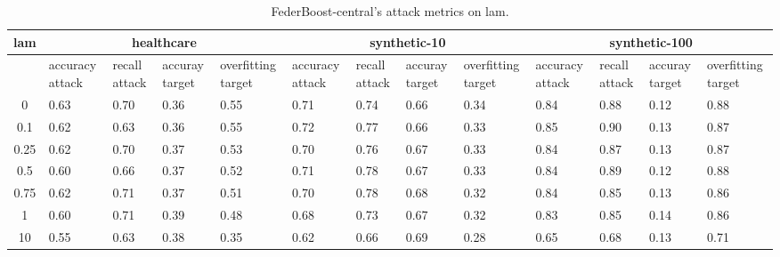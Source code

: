 \begin{table*}[]\centering
\begin{tabular}{|c| *{12}{m{1.0cm}|}}
\hline\rowcolor{gray!50}
\cellcolor{gray!80} lam & \multicolumn{4}{c|}{healthcare} & \multicolumn{4}{c|}{synthetic-10} & \multicolumn{4}{c|}{synthetic-100}\\\hline 
& accuracy attack & recall attack & accuray target & overfitting target & accuracy attack & recall attack & accuray target & overfitting target & accuracy attack & recall attack & accuray target & overfitting target\\\hline
0 & 0.63 & 0.70 & 0.36 & 0.55 & 0.71 & 0.74 & 0.66 & 0.34 & 0.84 & 0.88 & 0.12 & 0.88\\ \hline
0.1 & 0.62 & 0.63 & 0.36 & 0.55 & 0.72 & 0.77 & 0.66 & 0.33 & 0.85 & 0.90 & 0.13 & 0.87\\ \hline
0.25 & 0.62 & 0.70 & 0.37 & 0.53 & 0.70 & 0.76 & 0.67 & 0.33 & 0.84 & 0.87 & 0.13 & 0.87\\ \hline
0.5 & 0.60 & 0.66 & 0.37 & 0.52 & 0.71 & 0.78 & 0.67 & 0.33 & 0.84 & 0.89 & 0.12 & 0.88\\ \hline
0.75 & 0.62 & 0.71 & 0.37 & 0.51 & 0.70 & 0.78 & 0.68 & 0.32 & 0.84 & 0.85 & 0.13 & 0.86\\ \hline
1 & 0.60 & 0.71 & 0.39 & 0.48 & 0.68 & 0.73 & 0.67 & 0.32 & 0.83 & 0.85 & 0.14 & 0.86\\ \hline
10 & 0.55 & 0.63 & 0.38 & 0.35 & 0.62 & 0.66 & 0.69 & 0.28 & 0.65 & 0.68 & 0.13 & 0.71\\ \hline
\end{tabular} 
\caption{FederBoost-central's attack metrics on lam.}
\label{tab:experiment1_lam}
\end{table*}
